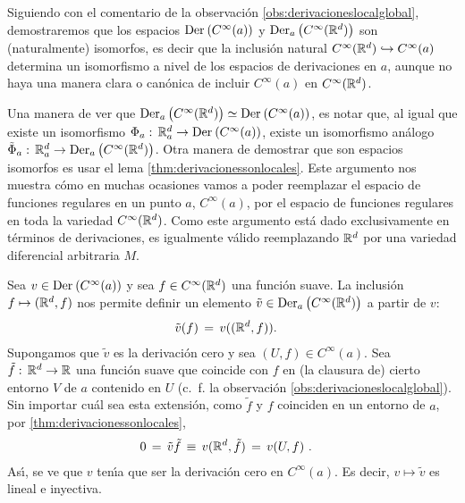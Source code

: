 \begin{obsDerivacionesIsomorfas}\label{obs:derivacionesisomorfas}
	Siguiendo con el comentario de la observaci\'{o}n
	\ref{obs:derivacioneslocalglobal}, demostraremos que los espacios
	$\derivaciones{C^{\infty}(a)}$ y
	$\derivaciones[a]{C^{\infty}(\bb{R}^{d})}$ son (naturalmente)
	isomorfos, es decir que la inclusi\'{o}n natural
	$C^{\infty}(\bb{R}^{d})\hookrightarrow C^{\infty}(a)$ determina un
	isomorfismo a nivel de los espacios de derivaciones en $a$, aunque
	no haya una manera clara o can\'{o}nica de incluir $C^{\infty}(a)$
	en $C^{\infty}(\bb{R}^{d})$.

	Una manera de ver que $\derivaciones[a]{C^{\infty}(\bb{R}^{d})}\simeq%
	\derivaciones{C^{\infty}(a)}$, es notar que, al igual que
	existe un isomorfismo $\Phi_{a}:\,\bb{R}^{d}_{a}\rightarrow%
	\derivaciones{C^{\infty}(a)}$, existe un isomorfismo an\'{a}logo
	$\tilde{\Phi}_{a}:\,\bb{R}^{d}_{a}\rightarrow%
	\derivaciones[a]{C^{\infty}(\bb{R}^{d})}$. Otra manera de demostrar
	que son espacios isomorfos es usar el lema
	\ref{thm:derivacionessonlocales}. Este argumento nos muestra c\'{o}mo
	en muchas ocasiones vamos a poder reemplazar el espacio de funciones
	regulares en un punto $a$, $C^{\infty}(a)$, por el espacio de
	funciones regulares en toda la variedad $C^{\infty}(\bb{R}^{d})$.
	Como este argumento est\'{a} dado exclusivamente en t\'{e}rminos de
	derivaciones, es igualmente v\'{a}lido reemplazando $\bb{R}^{d}$
	por una variedad diferencial arbitraria $M$.

	Sea $v\in\derivaciones{C^{\infty}(a)}$ y sea
	$f\in C^{\infty}(\bb{R}^{d})$ una funci\'{o}n suave. La inclusi\'{o}n
	$f\mapsto (\bb{R}^{d},f)$ nos permite definir un elemento
	$\tilde{v}\in\derivaciones[a]{C^{\infty}(\bb{R}^{d})}$ a partir de $v$:
	\begin{align*}
		\tilde{v}(f) & \,=\,v((\bb{R}^{d},f)).
	\end{align*}
	Supongamos que $\tilde{v}$ es la derivaci\'{o}n cero y sea
	$(U,f)\in C^{\infty}(a)$. Sea $\tilde{f}:\,\bb{R}^{d}\rightarrow\bb{R}$
	una funci\'{o}n suave que coincide con $f$ en (la clausura de)
	cierto entorno $V$ de $a$ contenido en $U$ (c.~f. la observaci\'{o}n
	\ref{obs:derivacioneslocalglobal}). Sin importar cu\'{a}l sea
	esta extensi\'{o}n, como $\tilde{f}$ y $f$ coinciden en un entorno
	de $a$, por \ref{thm:derivacionessonlocales},
	\begin{align*}
		0 & \,=\,\tilde{v}\tilde{f} \,\equiv\,v(\bb{R}^{d},\tilde{f})
			\,=\,v(U,f)
		\text{ .}
	\end{align*}
	As\'{\i}, se ve que $v$ ten\'{\i}a que ser la derivaci\'{o}n cero
	en $C^{\infty}(a)$. Es decir, $v\mapsto\tilde{v}$ es lineal e
	inyectiva.


\end{obsDerivacionesIsomorfas}
